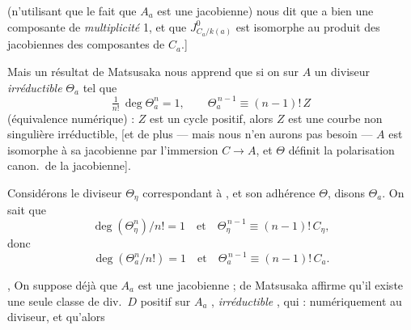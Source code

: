 \documentclass[11pt,a4paper]{article}
\begin{document}

(n'utilisant que le fait que $A_{a}$ est une jacobienne) nous dit que
  a bien une composante de
\emph{multiplicité} 1, et que $J^{0}_{C_{a}/k(a)}$ est isomorphe au produit
des jacobiennes des composantes de $C_{a}$.]


Mais un résultat de Matsusaka  nous apprend que si on
\ill{} sur $A$ un diviseur  \emph{irréductible} $\Theta_{a}$ tel
que 
\[
  \tfrac{1}{n!}\,\deg \Theta_{a}^{n} = 1,
  \qquad
  \Theta_{a}^{\,n-1} \equiv (n-1)!\, Z
\]
(équivalence numérique) : $Z$ est un cycle positif, alors $Z$ \struck{\ill{}}
est une courbe non singulière irréductible, [et de plus --- mais nous n'en
aurons pas besoin --- $A$ est isomorphe à sa jacobienne \struck{\ill{}} par
l'immersion $C \to A$, et $\Theta$ définit la polarisation canon.\ de la
jacobienne].


\struck{\ill{}}  Considérons le diviseur
$\Theta_{\eta}$ correspondant à \ill{}, et son adhérence $\Theta$, disons
$\Theta_{a}$. On sait que
\[
  \deg(\Theta_{\eta}^{n})/n! = 1
  \quad\text{et}\quad
  \Theta_{\eta}^{\,n-1} \equiv (n-1)!\, C_{\eta},
\]
donc
\[
  \deg(\Theta_{a}^{n}/n!) = 1
  \quad\text{et}\quad
  \Theta_{a}^{\,n-1} \equiv (n-1)!\, C_{a}.
\]
 



 \struck{\ill{}}, On
suppose déjà que $A_{a}$ est une jacobienne  ;
 de Matsusaka
affirme qu'il existe \struck{\ill{}}  une seule classe
\ill{} de div.\ $D$ positif sur $A_{a}$ \struck{\ill{}}, \emph{irréductible}
\ill{} \ill{}, qui  \ill{} : \ill{} \ill{} numériquement
\ill{} au diviseur, et qu'alors
\end{document}
